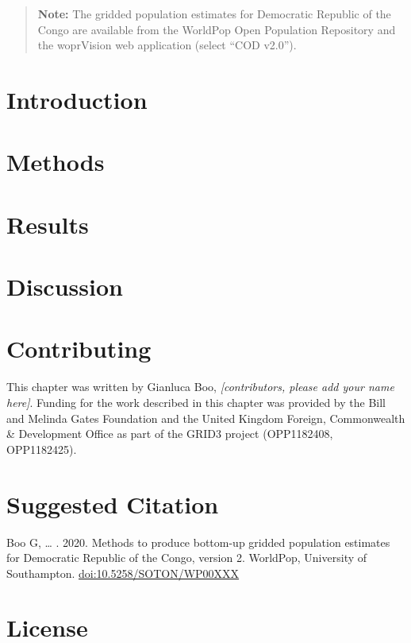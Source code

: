 \documentclass[]{book}
\begin{document}
\begin{quote}
\textbf{Note:} The gridded population estimates for Democratic Republic
of the Congo are available from the WorldPop Open Population Repository
and the woprVision web application (select ``COD v2.0'').
\end{quote}

\section{Introduction}\label{introduction-4}

\section{Methods}\label{methods-2}

\section{Results}\label{results-2}

\section{Discussion}\label{discussion-3}

\section*{Contributing}\label{contributing-8}

This chapter was written by Gianluca Boo, \emph{{[}contributors, please
add your name here{]}}. Funding for the work described in this chapter
was provided by the Bill and Melinda Gates Foundation and the United
Kingdom Foreign, Commonwealth \& Development Office as part of the GRID3
project (OPP1182408, OPP1182425).

\section*{Suggested Citation}\label{suggested-citation-8}

Boo G, \ldots{} . 2020. Methods to produce bottom-up gridded population
estimates for Democratic Republic of the Congo, version 2. WorldPop,
University of Southampton. \url{doi:10.5258/SOTON/WP00XXX}

\section*{License}\label{license-6}
\end{document}
